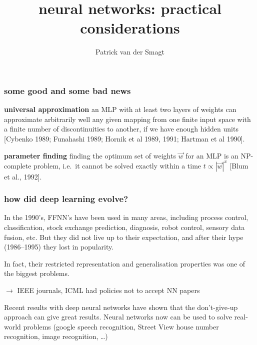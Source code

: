 \documentclass[USenglish,pdftex,compress,10pt,svgnamesi,handout]{beamer}
\title{neural networks: practical considerations}
\author{Patrick van der Smagt}
\date{}
\newcommand{\bfw}{\Vec{w}}
\begin{document}
\begin{frame}
	\titlepage
	
	\vfil
\end{frame}


\begin{frame}
\frametitle{some good and some bad news}
\hfill
\begin{beamerboxesrounded}[scheme=proof,width=0.95\textwidth,shadow=true]{\textbf{universal approximation}}
	an MLP with at least two layers of weights can approximate arbitrarily well any given mapping from one finite input space with a finite number of discontinuities to another, if we have enough hidden units [Cybenko 1989; Funahashi 1989; Hornik et al 1989, 1991; Hartman et al 1990].
\end{beamerboxesrounded}
\hspace*{\fill}
\bigskip
	\pause

\hfill
\begin{beamerboxesrounded}[scheme=proof,width=0.95\textwidth,shadow=true]{\textbf{parameter finding}}
	finding the optimum set of weights $\bfw$  for an MLP is an NP-complete problem, i.e.\ it cannot be solved exactly within a time $t\propto |\bfw|^x$ [Blum et al., 1992].
\end{beamerboxesrounded}
\hspace*{\fill}
\end{frame}




\begin{frame}
\frametitle{how did deep learning evolve?}

In the 1990's, FFNN's have been used in many areas, including process control, classification, stock exchange prediction, diagnosis, robot control, sensory data fusion, etc. But they did not live up to their expectation, and after their hype (1986--1995) they lost in popularity.  

In fact, their restricted representation and generalisation properties was one of the biggest problems.

$\rightarrow$ IEEE journals, ICML had policies not to accept NN papers

Recent results with deep neural networks have shown that the don't-give-up approach can give great results.  Neural networks now can be used to solve real-world problems (google speech recognition, Street View house number recognition, image recognition, \dots)
\end{frame}
\end{document}

